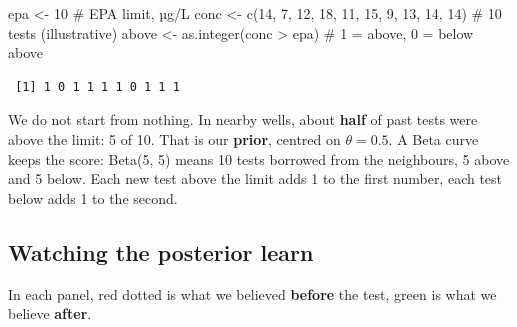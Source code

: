 \documentclass[
  letterpaper,
  DIV=11,
  numbers=noendperiod]{scrartcl}
\newenvironment{Shaded}{\begin{snugshade}}{\end{snugshade}}
\newcommand{\CommentTok}[1]{\textcolor[rgb]{0.37,0.37,0.37}{#1}}
\newcommand{\DecValTok}[1]{\textcolor[rgb]{0.68,0.00,0.00}{#1}}
\newcommand{\FunctionTok}[1]{\textcolor[rgb]{0.28,0.35,0.67}{#1}}
\newcommand{\NormalTok}[1]{\textcolor[rgb]{0.00,0.23,0.31}{#1}}
\newcommand{\OtherTok}[1]{\textcolor[rgb]{0.00,0.23,0.31}{#1}}
\newcommand{\SpecialCharTok}[1]{\textcolor[rgb]{0.37,0.37,0.37}{#1}}
\begin{document}
\begin{Shaded}
\begin{Highlighting}[]
\NormalTok{epa   }\OtherTok{\textless{}{-}} \DecValTok{10}                                          \CommentTok{\# EPA limit, µg/L}
\NormalTok{conc  }\OtherTok{\textless{}{-}} \FunctionTok{c}\NormalTok{(}\DecValTok{14}\NormalTok{, }\DecValTok{7}\NormalTok{, }\DecValTok{12}\NormalTok{, }\DecValTok{18}\NormalTok{, }\DecValTok{11}\NormalTok{, }\DecValTok{15}\NormalTok{, }\DecValTok{9}\NormalTok{, }\DecValTok{13}\NormalTok{, }\DecValTok{14}\NormalTok{, }\DecValTok{14}\NormalTok{)     }\CommentTok{\# 10 tests (illustrative)}
\NormalTok{above }\OtherTok{\textless{}{-}} \FunctionTok{as.integer}\NormalTok{(conc }\SpecialCharTok{\textgreater{}}\NormalTok{ epa)                      }\CommentTok{\# 1 = above, 0 = below}
\NormalTok{above}
\end{Highlighting}
\end{Shaded}

\begin{verbatim}
 [1] 1 0 1 1 1 1 0 1 1 1
\end{verbatim}

We do not start from nothing. In nearby wells, about \textbf{half} of
past tests were above the limit: 5 of 10. That is our \textbf{prior},
centred on \(\theta = 0.5\). A Beta curve keeps the score: Beta(5, 5)
means 10 tests borrowed from the neighbours, 5 above and 5 below. Each
new test above the limit adds 1 to the first number, each test below
adds 1 to the second.

\subsection{Watching the posterior
learn}\label{watching-the-posterior-learn}

In each panel, red dotted is what we believed \textbf{before} the test,
green is what we believe \textbf{after}.
\end{document}
